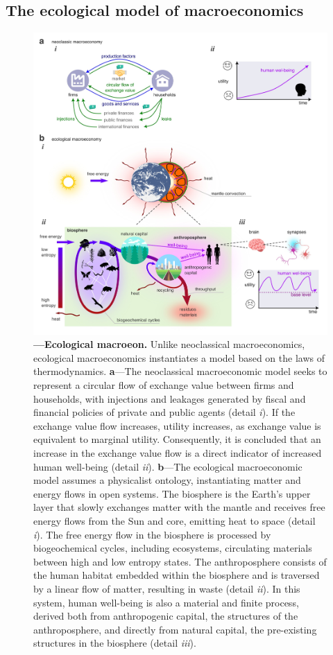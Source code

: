 \documentclass[./main_en.tex]{subfiles}
\begin{document}
\subsection{The ecological model of macroeconomics} \label{subsec:ecomodel}

\begin{figure}[t!] 
\centering				
\includegraphics[width=0.98\linewidth]{figs/fig_ecomodel_en.jpg}		
\caption[Ecological \gls{macroeon}]
{\textbf{---\;Ecological \gls{macroeon}.}
    Unlike neoclassical macroeconomics, ecological macroeconomics instantiates a model based on the laws of thermodynamics.     
    \;\textbf{a}\;---\;The neoclassical macroeconomic model seeks to represent a circular flow of exchange value between firms and households, with injections and leakages generated by fiscal and financial policies of private and public agents (detail \textrm{\textit{i}}). If the exchange value flow increases, utility increases, as exchange value is equivalent to marginal utility. Consequently, it is concluded that an increase in the exchange value flow is a direct indicator of increased human well-being (detail \textrm{\textit{ii}}).    
    \;\textbf{b}\;---\;The ecological macroeconomic model assumes a physicalist ontology, instantiating matter and energy flows in open systems. The biosphere is the Earth’s upper layer that slowly exchanges matter with the mantle and receives free energy flows from the Sun and core, emitting heat to space (detail \textrm{\textit{i}}). The free energy flow in the biosphere is processed by biogeochemical cycles, including ecosystems, circulating materials between high and low entropy states. The anthroposphere consists of the human habitat embedded within the biosphere and is traversed by a linear flow of matter, resulting in waste (detail \textrm{\textit{ii}}). In this system, human well-being is also a material and finite process, derived both from anthropogenic capital, the structures of the anthroposphere, and directly from natural capital, the pre-existing structures in the biosphere (detail \textrm{\textit{iii}}).
}
\end{figure}
\end{document}

